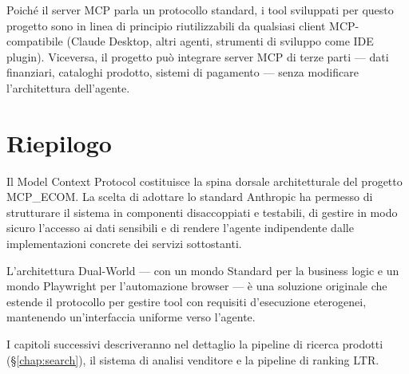 Poiché il server MCP parla un protocollo standard, i tool sviluppati
per questo progetto sono in linea di principio riutilizzabili da
qualsiasi client MCP-compatibile (Claude Desktop, altri agenti,
strumenti di sviluppo come IDE plugin). Viceversa, il progetto può
integrare server MCP di terze parti — dati finanziari, cataloghi
prodotto, sistemi di pagamento — senza modificare l'architettura
dell'agente.

\section{Riepilogo}
\label{sec:mcp-summary}

Il Model Context Protocol costituisce la spina dorsale architetturale
del progetto MCP\_ECOM. La scelta di adottare lo standard Anthropic ha
permesso di strutturare il sistema in componenti disaccoppiati e
testabili, di gestire in modo sicuro l'accesso ai dati sensibili e di
rendere l'agente indipendente dalle implementazioni concrete dei servizi
sottostanti.

L'architettura Dual-World — con un mondo Standard per la business logic
e un mondo Playwright per l'automazione browser — è una soluzione
originale che estende il protocollo per gestire tool con requisiti
d'esecuzione eterogenei, mantenendo un'interfaccia uniforme verso
l'agente.

I capitoli successivi descriveranno nel dettaglio la pipeline di
ricerca prodotti (\S\ref{chap:search}), il sistema di analisi venditore
e la pipeline di ranking LTR.

